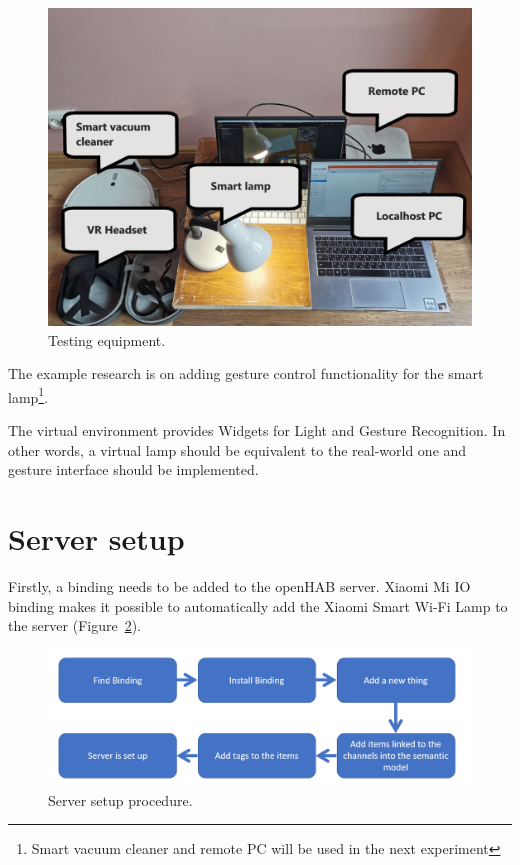 \begin{figure}
  \centering
  \includegraphics[width=0.9\linewidth]{figures/TestingEquipment.png}
  \caption{Testing equipment.}
  \label{fig:TestingEquipment-figure}
\end{figure}

The example research is on adding gesture control functionality for the smart lamp\footnote{Smart vacuum cleaner and remote PC will be used in the next experiment}.

The virtual environment provides Widgets for Light and Gesture Recognition. In other words, a virtual lamp should be equivalent to the real-world one and gesture interface should be implemented.

\section{Server setup}
Firstly, a binding needs to be added to the openHAB server. Xiaomi Mi IO binding makes it possible to automatically add the Xiaomi Smart Wi-Fi Lamp to the server (Figure~\ref{fig:ServerSetupProcedure-figure}).

\begin{figure}
  \centering
  \includegraphics[width=0.9\linewidth]{figures/ServerSetupProcedure.png}
  \caption{Server setup procedure.}
  \label{fig:ServerSetupProcedure-figure}
\end{figure}

